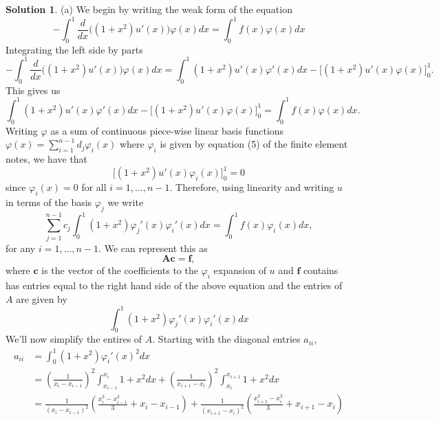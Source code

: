 \documentclass[12pt]{article}
\renewcommand{\vec}[1]{\mathbf{#1}}
\renewcommand{\phi}{\varphi}
\theoremstyle{definition}
\newtheorem{sol}{Solution}
\theoremstyle{remark}
\begin{document}
\begin{sol}
    (a) We begin by writing the weak form of the equation
    \begin{equation*}
        -\int_{0}^{1} \frac{d}{dx}\Big( (1+x^{2}) u'(x)\Big) \phi(x) dx = \int_{0}^{1} f(x)\phi(x)dx
    \end{equation*}
    Integrating the left side by parts
    \begin{equation*}
        -\int_{0}^{1} \frac{d}{dx}\Big( (1+x^{2}) u'(x)\Big) \phi(x) dx  =  \int_{0}^{1} (1 + x^{2}) u'(x) \phi'(x)dx   -\Big[ (1+x^{2}) u'(x) \phi(x) \Big]_{0}^{1}.
    \end{equation*}
    This gives us 
    \begin{equation*}
    \int_{0}^{1} (1 + x^{2}) u'(x) \phi'(x)dx   -\Big[ (1+x^{2}) u'(x) \phi(x) \Big]_{0}^{1} = \int_{0}^{1} f(x)\phi(x)dx.
    \end{equation*}
    Writing $\phi$ as a sum of continuous piece-wise linear basis functions $\phi(x) = \sum_{i=1}^{n-1} d_{j} \phi_{i}(x)$ where $\phi_{i}$ is given by equation (5) of the finite element notes, we have that
    \begin{equation*}
 \Big[ (1+x^{2}) u'(x) \phi_{i}(x) \Big]_{0}^{1} = 0
    \end{equation*}
    since $\phi_{i}(x) = 0$ for all $i = 1, \ldots, n-1$. Therefore, using linearity and writing $u$ in terms of the basis $\phi_{j}$ we write 
    \begin{equation*}
        \sum_{j = 1}^{n-1} c_{j} \int_{0}^{1} (1 + x^{2}) \phi_{j}'(x) \phi_{i}'(x)dx = \int_{0}^{1} f(x)\phi_{i}(x)dx,
    \end{equation*}
    for any $i = 1, \ldots, n - 1$. We can represent this as
    \begin{equation*}
        \vec{A} \vec{c} = \vec{f},
    \end{equation*}
    where $\vec{c}$ is the vector of the coefficients to the $\phi_{i}$ expansion of $u$ and $\vec{f}$ contains has entries equal to the right hand side of the above equation and the entries of $A$ are given by
\begin{equation*}
 \int_{0}^{1} (1 + x^{2}) \phi_{j}'(x) \phi_{i}'(x)dx
\end{equation*}
    We'll now simplify the entires of $A$. Starting with the diagonal entries $a_{ii}$,
    \begin{align*}
        a_{ii} &= \int_0^1  (1 + x^{2}) \phi_{i}'(x)^{2} dx\\
               &= \left(\frac{1}{x_{i} - x_{i-1}}\right)^{2}\int_{x_{i-1}}^{x_{i}} 1 + x^{2} dx 
               + \left( \frac{1}{x_{i+1} - x_{i}} \right)^{2} \int_{x_{i}}^{x_{i+1}} 1 + x^{2} dx\\
               &= \frac{1}{(x_{i} - x_{i-1})^{2}} \left( \frac{x_{i}^{3} - x_{i-1}^{3}}{3} +  x_{i} - x_{i-1} \right) + \frac{1}{(x_{i+1} - x_{i})^{2}} \left( \frac{x_{i+1}^{3} - x_{i}^{3}}{3} +  x_{i+1} - x_{i} \right) \\
\end{align*}


\end{sol}
\end{document}
